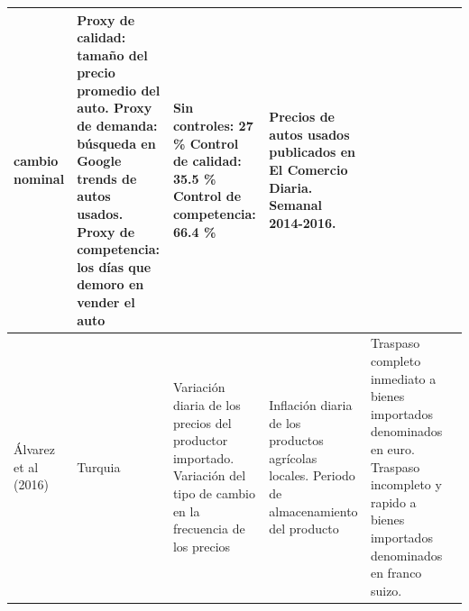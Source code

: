 \documentclass[12pt,a4paper,pdflatex]{article}
\begin{document}
\begin{table}[!h]
{\begin{tabular}{p{2.5cm}m{3em}m{3.5cm}m{3cm}m{2.5cm}m{3cm}}
cambio nominal & Proxy de calidad: tamaño del precio promedio del auto. Proxy de demanda: búsqueda en Google trends de autos usados. Proxy de competencia: los días que demoro en vender el auto & Sin controles:
27 \% Control de calidad: 35.5 \% Control de competencia: 66.4 \% & Precios de autos usados
publicados en El Comercio Diaria. Semanal 2014-2016.\\
  \hline
  Álvarez et al (2016)& Turquia & Variación diaria de los precios del productor importado. Variación del tipo de cambio en la frecuencia de los precios & Inflación diaria de los productos agrícolas locales. Periodo de almacenamiento del producto & Traspaso completo inmediato a bienes importados denominados en euro. Traspaso incompleto y rapido a bienes importados denominados en franco suizo. & \\
  \hline
\end{tabular}
\label{table:1}
}
\end{table}
\end{document}
